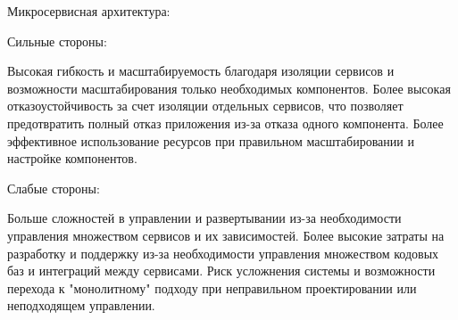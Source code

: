     Микросервисная архитектура:
    
    Сильные стороны:
    
        Высокая гибкость и масштабируемость благодаря изоляции сервисов и возможности масштабирования только необходимых компонентов.
        Более высокая отказоустойчивость за счет изоляции отдельных сервисов, что позволяет предотвратить полный отказ приложения из-за отказа одного компонента.
        Более эффективное использование ресурсов при правильном масштабировании и настройке компонентов.
    
    Слабые стороны:
    
        Больше сложностей в управлении и развертывании из-за необходимости управления множеством сервисов и их зависимостей.
        Более высокие затраты на разработку и поддержку из-за необходимости управления множеством кодовых баз и интеграций между сервисами.
        Риск усложнения системы и возможности перехода к "монолитному" подходу при неправильном проектировании или неподходящем управлении.
        
\clearpage